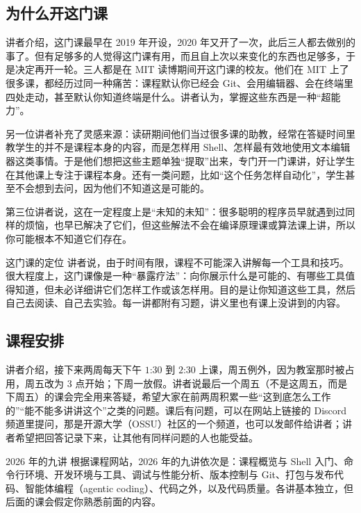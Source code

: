 \documentclass[a4paper]{article}
\begin{document}
\subsection{为什么开这门课}

讲者介绍，这门课最早在 2019 年开设，2020 年又开了一次，此后三人都去做别的事了。但有足够多的人觉得这门课有用，而且自上次以来变化的东西也足够多，于是决定再开一轮。三人都是在 MIT 读博期间开这门课的校友。他们在 MIT 上了很多课，都经历过同一种痛苦：课程默认你已经会 Git、会用编辑器、会在终端里四处走动，甚至默认你知道终端是什么。讲者认为，掌握这些东西是一种“超能力”。

另一位讲者补充了灵感来源：读研期间他们当过很多课的助教，经常在答疑时间里教学生的并不是课程本身的内容，而是怎样用 Shell、怎样最有效地使用文本编辑器这类事情。于是他们想把这些主题单独“提取”出来，专门开一门课讲，好让学生在其他课上专注于课程本身。还有一类问题，比如“这个任务怎样自动化”，学生甚至不会想到去问，因为他们不知道这是可能的。

第三位讲者说，这在一定程度上是“未知的未知”：很多聪明的程序员早就遇到过同样的烦恼，也早已解决了它们，但这些解法不会在编译原理课或算法课上讲，所以你可能根本不知道它们存在。

\begin{importantbox}{这门课的定位}
讲者说，由于时间有限，课程不可能深入讲解每一个工具和技巧。很大程度上，这门课像是一种“暴露疗法”：向你展示什么是可能的、有哪些工具值得知道，但未必详细讲它们怎样工作或该怎样用。目的是让你知道这些工具，然后自己去阅读、自己去实验。每一讲都附有习题，讲义里也有课上没讲到的内容。
\end{importantbox}

\subsection{课程安排}

讲者介绍，接下来两周每天下午 $1$:$30$ 到 $2$:$30$ 上课，周五例外，因为教室那时被占用，周五改为 $3$ 点开始；下周一放假。讲者说最后一个周五（不是这周五，而是下周五）的课会完全用来答疑，希望大家在前两周积累一些“这到底怎么工作的”“能不能多讲讲这个”之类的问题。课后有问题，可以在网站上链接的 Discord 频道里提问，那是开源大学（OSSU）社区的一个频道，也可以发邮件给讲者；讲者希望把回答记录下来，让其他有同样问题的人也能受益。

\begin{knowledgebox}{2026 年的九讲}
根据课程网站，2026 年的九讲依次是：课程概览与 Shell 入门、命令行环境、开发环境与工具、调试与性能分析、版本控制与 Git、打包与发布代码、智能体编程（agentic coding）、代码之外，以及代码质量。各讲基本独立，但后面的课会假定你熟悉前面的内容。
\end{knowledgebox}
\end{document}
